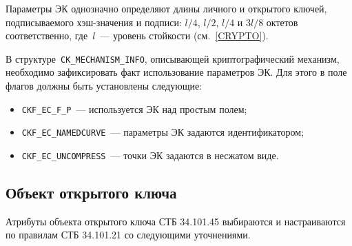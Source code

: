 Параметры ЭК однозначно определяют длины личного и открытого ключей, 
подписываемого хэш-значения и подписи: $l/4$, $l/2$, $l/4$ и $3l/8$ 
октетов соответственно, где~$l$~--- уровень стойкости (см.~\ref{CRYPTO}). 

В структуре~\verb|CK_MECHANISM_INFO|, описывающей криптографический 
механизм, необходимо зафиксировать факт использование параметров ЭК.
Для этого в поле флагов должны быть установлены следующие: 
\begin{itemize}
\item
\verb|CKF_EC_F_P|~--- используется ЭК над простым полем;
\item
\verb|CKF_EC_NAMEDCURVE|~--- параметры ЭК задаются идентификатором;
\item
\verb|CKF_EC_UNCOMPRESS|~--- точки ЭК задаются в несжатом виде.
\end{itemize}

\subsection{Объект открытого ключа}\label{CRYPTOKI.Pubkey}

Атрибуты объекта открытого ключа СТБ 34.101.45 
выбираются и настраиваются по правилам СТБ 34.101.21 со 
следующими уточнениями.

